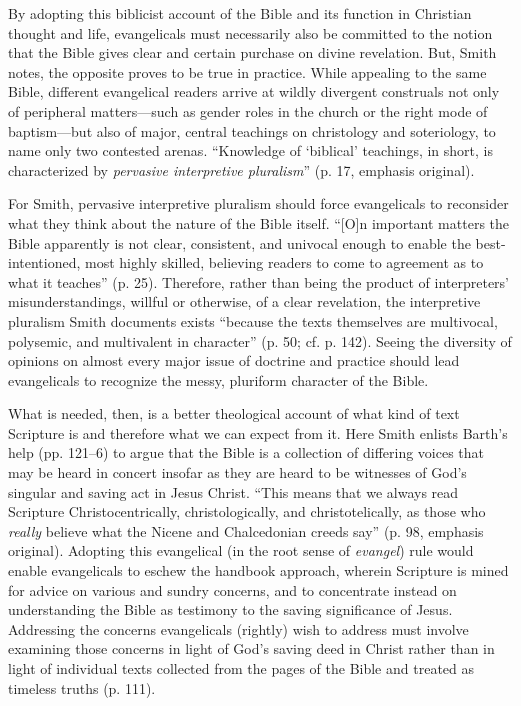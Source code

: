 By adopting this biblicist account of the Bible and its function in
Christian thought and life, evangelicals must necessarily also be
committed to the notion that the Bible gives clear and certain purchase
on divine revelation. But, Smith notes, the opposite proves to be true
in practice. While appealing to the same Bible, different evangelical
readers arrive at wildly divergent construals not only of peripheral
matters—such as gender roles in the church or the right mode of
baptism—but also of major, central teachings on christology and
soteriology, to name only two contested arenas. “Knowledge of ‘biblical’
teachings, in short, is characterized by \emph{pervasive interpretive
pluralism}” (p. 17, emphasis original).

For Smith, pervasive interpretive pluralism should force evangelicals to
reconsider what they think about the nature of the Bible itself. “[O]n
important matters the Bible apparently is not clear, consistent, and
univocal enough to enable the best-intentioned, most highly skilled,
believing readers to come to agreement as to what it teaches” (p. 25).
Therefore, rather than being the product of interpreters’
misunderstandings, willful or otherwise, of a clear revelation, the
interpretive pluralism Smith documents exists “because the texts
themselves are multivocal, polysemic, and multivalent in character” (p.
50; cf. p. 142). Seeing the diversity of opinions on almost every major
issue of doctrine and practice should lead evangelicals to recognize the
messy, pluriform character of the Bible.

What is needed, then, is a better theological account of what kind of
text Scripture is and therefore what we can expect from it. Here Smith
enlists Barth’s help (pp. 121--6) to argue that the Bible is a collection
of differing voices that may be heard in concert insofar as they are
heard to be witnesses of God’s singular and saving act in Jesus Christ.
“This means that we always read Scripture Christocentrically,
christologically, and christotelically, as those who \emph{really} believe
what the Nicene and Chalcedonian creeds say” (p. 98, emphasis original).
Adopting this evangelical (in the root sense of \emph{evangel}) rule would
enable evangelicals to eschew the handbook approach, wherein Scripture
is mined for advice on various and sundry concerns, and to concentrate
instead on understanding the Bible as testimony to the saving
significance of Jesus. Addressing the concerns evangelicals (rightly)
wish to address must involve examining those concerns in light of God’s
saving deed in Christ rather than in light of individual texts collected
from the pages of the Bible and treated as timeless truths (p. 111).

